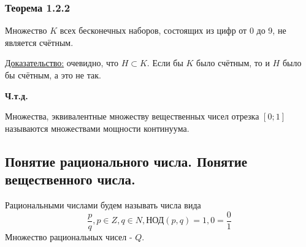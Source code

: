 \documentclass[12pt]{article}
\begin{document}
    \subsubsection*{Теорема 1.2.2}\label{th:1.2.2}
    Множество $K$ всех бесконечных наборов, состоящих из цифр от 0 до 9, не является счётным.\par\noindent
    \underline{Доказательство:} очевидно, что $H \subset K$. Если бы $K$ было счётным, то и $H$ было бы счётным, а это не так.
    \begin{center}
        \textbf{Ч.т.д.}
    \end{center}
    Множества, эквивалентные множеству вещественных чисел отрезка $[0;1]$ называются множествами мощности континуума.

    \subsection{Понятие рационального числа. Понятие вещественного числа.}
    \noindent Рациональными числами будем называть числа вида \[\frac{p}{q}, p \in Z, q \in N, \text{НОД}(p,q) = 1, 0 = \frac{0}{1}\]
    Множество рациональных чисел - $Q$.
\end{document}

